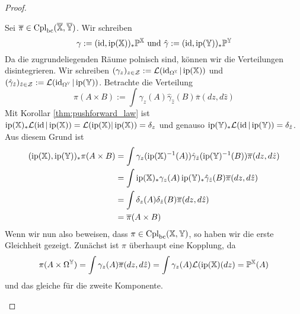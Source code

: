 \begin{proof}
\begin{enumerate}[(i)]
Sei $\overline{\pi} \in \operatorname{Cpl}_{\operatorname{bc}}(\overline{\mathbb{X}}, \overline{\mathbb{Y}})$. Wir schreiben
$$\gamma := (\operatorname{id}, \operatorname{ip}(\mathbb{X}))_*\mathbb{P}^\mathbb{X} \text{ und } \hat{\gamma}:=(\operatorname{id}, \operatorname{ip}(\mathbb{Y}))_*\mathbb{P}^\mathbb{Y}$$
Da die zugrundeliegenden Räume polnisch sind, können wir die Verteilungen disintegrieren. Wir schreiben $(\gamma_z)_{z \in \mathcal{Z}}:=\mathcal{L}(\operatorname{id}_{\Omega^\mathbb{X}} \vert \operatorname{ip}(\mathbb{X}))$ und $(\hat{\gamma}_{\hat{z}})_{\hat{z} \in \mathcal{Z}}:=\mathcal{L}(\operatorname{id}_{\Omega^\mathbb{Y}} \vert \operatorname{ip}(\mathbb{Y}))$.
Betrachte die Verteilung 
$$\pi(A\times B) := \int \gamma_z(A) \hat{\gamma}_{\hat{z}}(B)\overline{\pi}(dz, d\hat{z})$$
Mit Korollar \ref{thm:pushforward_law} ist $\operatorname{ip}(\mathbb{X})_*\mathcal{L}(\operatorname{id} \vert \operatorname{ip}(\mathbb{X}))= \mathcal{L}(\operatorname{ip}(\mathbb{X}) \vert \operatorname{ip}(\mathbb{X}))= \delta_{z}$ und genauso $\operatorname{ip}(\mathbb{Y})_*\mathcal{L}(\operatorname{id} \vert \operatorname{ip}(\mathbb{Y})) = \delta_{\hat{z}}$. Aus diesem Grund ist
\begin{align*}
(\operatorname{ip}(\mathbb{X}), \operatorname{ip}(\mathbb{Y}))_*\pi(A \times B) &= \int \gamma_z(\operatorname{ip}(\mathbb{X})^{-1}(A)) \hat{\gamma}_{\hat{z}}(\operatorname{ip}(\mathbb{Y})^{-1}(B))\overline{\pi}(dz, d\hat{z}) \\
&= \int \operatorname{ip}(\mathbb{X})_*\gamma_z(A) \operatorname{ip}(\mathbb{Y})_*\hat{\gamma}_{\hat{z}}(B) \overline{\pi}(dz, d\hat{z}) \\
&= \int \delta_z(A) \delta_{\hat{z}}(B)\overline{\pi}(dz, d\hat{z}) \\
&= \overline{\pi}(A \times B)
\end{align*}
Wenn wir nun also beweisen, dass $\pi \in \operatorname{Cpl}_{\operatorname{bc}}(\mathbb{X}, \mathbb{Y})$, so haben wir die erste Gleichheit gezeigt. Zunächst ist $\pi$ überhaupt eine Kopplung,  da 
$$\pi(A\times \Omega^{\mathbb{Y}}) = \int \gamma_z(A) \overline{\pi}(dz, d\hat{z}) = \int \gamma_z(A) \mathcal{L}(\operatorname{ip}(\mathbb{X})(dz) = \mathbb{P}^\mathbb{X}(A)$$
und das gleiche für die zweite Komponente.


\end{enumerate}
\end{proof}
